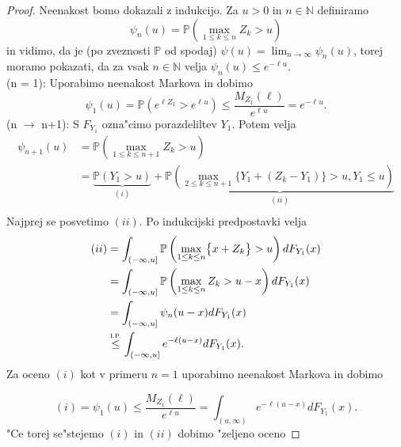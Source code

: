 \documentclass[12pt, a4paper, reqno]{amsart}
\theoremstyle{definition}
\theoremstyle{plain}
\newcommand{\N}{\mathbb{N}}
\newcommand{\Prob}{\mathbb{P}}
\newcommand{\1}{\mathds{1}}
\begin{document}
            \begin{proof}
                Neenakost bomo dokazali z indukcijo. Za $u>0$ in $n\in\N$ definiramo
                \begin{equation*}
                    \psi_n(u) = \Prob\left(\max_{1\leq k\leq n}Z_k > u\right)
                \end{equation*}
                in vidimo, da je (po zveznosti $\mathbb{P}$ od spodaj) $\psi(u) = \lim_{n\to\infty}\psi_n(u)$, 
                torej moramo pokazati, da za vsak $n\in\N$ velja $\psi_n(u) \leq e^{-\ell u}$. \\
                (n = 1): Uporabimo neenakost Markova in dobimo
                \begin{equation*}
                    \psi_1(u) = \Prob\left(e^{\ell Z_1} > e^{\ell u}\right) \leq \frac{M_{Z_1}(\ell)}{e^{\ell u}} = e^{-\ell u}.
                \end{equation*}
                (n $\rightarrow$ n+1): 
                S $F_{Y_1}$ ozna"cimo porazdeliltev $Y_1$. Potem velja
                \begin{align*}
                    \psi_{n+1}(u) &= \Prob\left(\max_{1\leq k\leq n+1}Z_k > u\right) \\
                                  &= \underbrace{\Prob\left(Y_1 > u\right)}_{(i)} + 
                                  \underbrace{\Prob\left(\max_{2\leq k\leq n+1}\bigl\{Y_1 + (Z_k - Y_1)\bigr\} > u, Y_1 \leq u\right)}_{(ii)} \\
                \end{align*}
                Najprej se posvetimo $(ii)$. Po indukcijski predpostavki velja 
                \begin{align*}
                    (ii) &= \int_{(-\infty, u]}\Prob\left(\max_{1\leq k\leq n}\bigl\{x + Z_k\bigr\} > u\right)dF_{Y_1}(x) \\
                         &= \int_{(-\infty, u]}\Prob\left(\max_{1\leq k\leq n}Z_k > u - x\right)dF_{Y_1}(x) \\
                         &= \int_{(-\infty, u]}\psi_n(u - x)dF_{Y_1}(x) \\
                         &\stackrel{\text{\scalebox{0.8}{I.P.}}}{\leq} \int_{(-\infty, u]}e^{-\ell(u - x)}dF_{Y_1}(x). \\
                \end{align*}
                Za oceno $(i)$ kot v primeru $n=1$ uporabimo neenakost Markova in dobimo

                \begin{equation*}
                    (i) = \psi_1(u) \leq \frac{M_{Z_1}(\ell)}{e^{\ell u}} = \int_{(u, \infty)}e^{-\ell (u-x)}dF_{Y_1}(x).
                \end{equation*}
                "Ce torej se"stejemo $(i)$ in $(ii)$ dobimo "zeljeno oceno


\end{proof}
\end{document}
